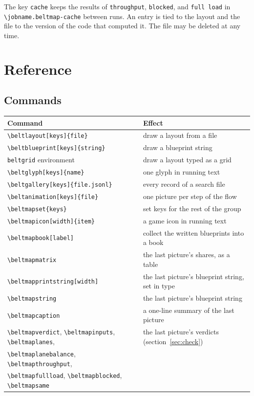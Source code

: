 \documentclass[11pt]{article}
\newcommand\cs[1]{\texttt{\textbackslash#1}}
\newcommand\key[1]{\texttt{#1}}
\begin{document}
	The key \key{cache} keeps the results of \key{throughput}, \key{blocked}, and \key{full load} in \texttt{\textbackslash jobname.beltmap-cache} between runs. An entry is tied to the layout and the file to the version of the code that computed it. The file may be deleted at any time.

	\section{Reference}
	\label{sec:keys}

	\subsection{Commands}

	\begin{tabularx}{\linewidth}{@{}l X@{}}
		\toprule
		Command & Effect \\
		\midrule
		\verb|\beltlayout[keys]{file}| & draw a layout from a file \\
		\verb|\beltblueprint[keys]{string}| & draw a blueprint string \\
		\texttt{beltgrid} environment & draw a layout typed as a grid \\
		\verb|\beltglyph[keys]{name}| & one glyph in running text \\
		\verb|\beltgallery[keys]{file.jsonl}| & every record of a search file \\
		\verb|\beltanimation[keys]{file}| & one picture per step of the flow \\
		\verb|\beltmapset{keys}| & set keys for the rest of the group \\
		\verb|\beltmapicon[width]{item}| & a game icon in running text \\
		\verb|\beltmapbook[label]| & collect the written blueprints into a book \\
		\cs{beltmapmatrix} & the last picture's shares, as a table \\
		\verb|\beltmapprintstring[width]| & the last picture's blueprint string, set in type \\
		\cs{beltmapstring} & the last picture's blueprint string \\
		\cs{beltmapcaption} & a one-line summary of the last picture \\
		\cs{beltmapverdict}, \cs{beltmapinputs}, \cs{beltmaplanes}, & the last picture's verdicts (section~\ref{sec:check}) \\
		\cs{beltmaplanebalance}, \cs{beltmapthroughput}, & \\
		\cs{beltmapfullload}, \cs{beltmapblocked}, \cs{beltmapsame} & \\
		\bottomrule
	\end{tabularx}
\end{document}

